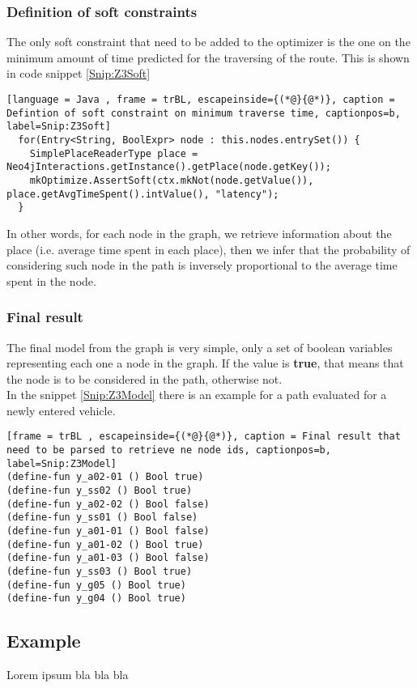 \subsubsection{Definition of soft constraints}
The only soft constraint that need to be added to the optimizer is the one on the minimum amount of time predicted for the traversing of the route. This is shown in code snippet \ref{Snip:Z3Soft}
\begin{lstlisting}[language = Java , frame = trBL, escapeinside={(*@}{@*)}, caption = Defintion of soft constraint on minimum traverse time, captionpos=b, label=Snip:Z3Soft]
  for(Entry<String, BoolExpr> node : this.nodes.entrySet()) {
    SimplePlaceReaderType place = Neo4jInteractions.getInstance().getPlace(node.getKey());
    mkOptimize.AssertSoft(ctx.mkNot(node.getValue()), place.getAvgTimeSpent().intValue(), "latency");
  }
\end{lstlisting}
In other words, for each node in the graph, we retrieve information about the place (i.e. average time spent in each place), then we infer that the probability of considering such node in the path is inversely proportional to the average time spent in the node.

\subsubsection{Final result}
The final model from the graph is very simple, only a set of boolean variables representing each one a node in the graph. If the value is \textbf{true}, that means that the node is to be considered in the path, otherwise not.\\
In the snippet \ref{Snip:Z3Model} there is an example for a path evaluated for a newly entered vehicle.
\begin{lstlisting}[frame = trBL , escapeinside={(*@}{@*)}, caption = Final result that need to be parsed to retrieve ne node ids, captionpos=b, label=Snip:Z3Model]
(define-fun y_a02-01 () Bool true)
(define-fun y_ss02 () Bool true)
(define-fun y_a02-02 () Bool false)
(define-fun y_ss01 () Bool false)
(define-fun y_a01-01 () Bool false)
(define-fun y_a01-02 () Bool true)
(define-fun y_a01-03 () Bool false)
(define-fun y_ss03 () Bool true)
(define-fun y_g05 () Bool true)
(define-fun y_g04 () Bool true)
\end{lstlisting}

\subsection{Example}
Lorem ipsum bla bla bla
